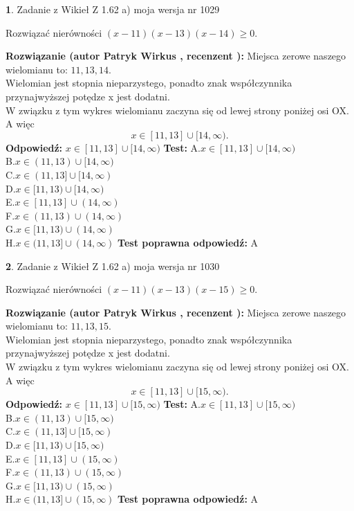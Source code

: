 \documentclass[12pt, a4paper]{article}
\theoremstyle{definition} %
\newtheorem{zad}{}
\newcommand{\zadStart}[1]{\begin{zad}#1\newline}
\newcommand{\zadStop}{\end{zad}}
\newcommand{\rozwStart}[2]{\noindent \textbf{Rozwiązanie (autor #1 , recenzent #2): }\newline}
\newcommand{\rozwStop}{\newline}
\newcommand{\odpStart}{\noindent \textbf{Odpowiedź:}\newline}
\newcommand{\odpStop}{\newline}
\newcommand{\testStart}{\noindent \textbf{Test:}\newline}
\newcommand{\testStop}{\newline}
\newcommand{\kluczStart}{\noindent \textbf{Test poprawna odpowiedź:}\newline}
\newcommand{\kluczStop}{\newline}
\begin{document}
\zadStart{Zadanie z Wikieł Z 1.62 a) moja wersja nr 1029}

Rozwiązać nierówności $(x-11)(x-13)(x-14)\ge0$.
\zadStop
\rozwStart{Patryk Wirkus}{}
Miejsca zerowe naszego wielomianu to: $11, 13, 14$.\\
Wielomian jest stopnia nieparzystego, ponadto znak współczynnika przy\linebreak najwyższej potędze x jest dodatni.\\ W związku z tym wykres wielomianu zaczyna się od lewej strony poniżej osi OX. A więc $$x \in [11,13] \cup [14,\infty).$$
\rozwStop
\odpStart
$x \in [11,13] \cup [14,\infty)$
\odpStop
\testStart
A.$x \in [11,13] \cup [14,\infty)$\\
B.$x \in (11,13) \cup [14,\infty)$\\
C.$x \in (11,13] \cup [14,\infty)$\\
D.$x \in [11,13) \cup [14,\infty)$\\
E.$x \in [11,13] \cup (14,\infty)$\\
F.$x \in (11,13) \cup (14,\infty)$\\
G.$x \in [11,13) \cup (14,\infty)$\\
H.$x \in (11,13] \cup (14,\infty)$
\testStop
\kluczStart
A
\kluczStop



\zadStart{Zadanie z Wikieł Z 1.62 a) moja wersja nr 1030}

Rozwiązać nierówności $(x-11)(x-13)(x-15)\ge0$.
\zadStop
\rozwStart{Patryk Wirkus}{}
Miejsca zerowe naszego wielomianu to: $11, 13, 15$.\\
Wielomian jest stopnia nieparzystego, ponadto znak współczynnika przy\linebreak najwyższej potędze x jest dodatni.\\ W związku z tym wykres wielomianu zaczyna się od lewej strony poniżej osi OX. A więc $$x \in [11,13] \cup [15,\infty).$$
\rozwStop
\odpStart
$x \in [11,13] \cup [15,\infty)$
\odpStop
\testStart
A.$x \in [11,13] \cup [15,\infty)$\\
B.$x \in (11,13) \cup [15,\infty)$\\
C.$x \in (11,13] \cup [15,\infty)$\\
D.$x \in [11,13) \cup [15,\infty)$\\
E.$x \in [11,13] \cup (15,\infty)$\\
F.$x \in (11,13) \cup (15,\infty)$\\
G.$x \in [11,13) \cup (15,\infty)$\\
H.$x \in (11,13] \cup (15,\infty)$
\testStop
\kluczStart
A
\kluczStop
\end{document}
